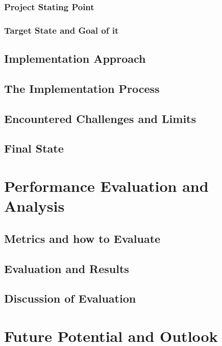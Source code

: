 \documentclass[12pt, a4paper]{article}
\begin{document}
        \subsubsection{Project Stating Point}
        \subsubsection{Target State and Goal of it}
    \subsection{Implementation Approach}\label{ssec::imp_approach}
    \subsection{The Implementation Process}\label{ssec::imp_process}
    \subsection{Encountered Challenges and Limits}
    \subsection{Final State} \label{sec::final}


\section{Performance Evaluation and Analysis}\label{sec::eval}
\subsection{Metrics and how to Evaluate}
    \subsection{Evaluation and Results}
    \subsection{Discussion of Evaluation}

\section{Future Potential and Outlook}\label{sec::outlook}
\end{document}
